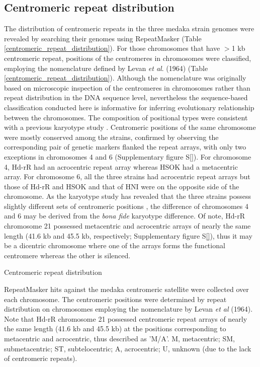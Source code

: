 \subsection*{Centromeric repeat distribution}
The distribution of centromeric repeats in the three medaka strain genomes were revealed by searching their genomes using RepeatMasker (Table \ref{centromeric_repeat_distribution}). For those chromosomes that have $>$1 kb centromeric repeat, positions of the centromeres in chromosomes were classified, employing the nomenclature defined by Levan \textit{et al}. (1964) (Table \ref{centromeric_repeat_distribution}). Although the nomenclature was originally based on microscopic inspection of the centromeres in chromosomes rather than repeat distribution in the DNA sequence level, nevertheless the sequence-based classification conducted here is informative for inferring evolutionary relationship between the chromosomes. The composition of positional types were consistent with a previous karyotype study \cite{}. Centromeric positions of the same chromosome were mostly conserved among the strains, confirmed by observing the corresponding pair of genetic markers flanked the repeat arrays, with only two exceptions in chromosomes 4 and 6 (Supplementary figure S\ref{}). For chromosome 4, Hd-rR had an acrocentric repeat array whereas HSOK had a metacentric array. For chromosome 6, all the three strains had acrocentric repeat arrays but those of Hd-rR and HSOK and that of HNI were on the opposite side of the chromosome. As the karyotype study has revealed that the three strains possess slightly different sets of centromeric positions \cite{}, the difference of chromosomes 4 and 6 may be derived from the \textit{bona fide} karyotype difference. Of note, Hd-rR chromosome 21 possessed metacentric and acrocentric arrays of nearly the same length (41.6 kb and 45.5 kb, respectively; Supplementary figure S\ref{}), thus it may be a dicentric chromosome where one of the arrays forms the functional centromere whereas the other is silenced.


\begin{table*}[htp]
  \centering
  \caption{Centromeric repeat distribution}
  
  \label{centromeric_repeat_distribution}
  \caption*{
    RepeatMasker hits against the medaka centromeric satellite were collected over each chromosome. The centromeric positions were determined by repeat distribution on chromosomes employing the nomenclature by Levan \textit{et al} (1964). Note that Hd-rR chromosome 21 possessed centromeric repeat arrays of nearly the same length (41.6 kb and 45.5 kb) at the positions corresponding to metacentric and acrocentric, thus described as 'M/A'. M, metacentric; SM, submetacentric; ST, subtelocentric; A, acrocentric; U, unknown (due to the lack of centromeric repeats).
  }
\end{table*}
